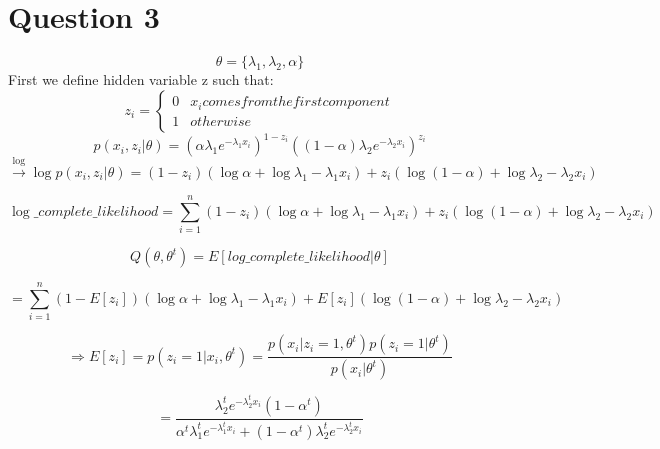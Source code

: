 \documentclass{article}
\begin{document}
\section*{Question 3}

\begin{equation*}
    \theta = \lbrace \lambda_1, \lambda_2, \alpha \rbrace
\end{equation*}
First we define hidden variable z such that:
\[
z_i =
\begin{cases}
0 & x_i comes from the first component \\
1  & otherwise
\end{cases}
\]
\begin{equation*}
    p(x_i, z_i | \theta) = (\alpha \lambda_1 e^{-\lambda_1 x_i})^{1-z_i} ((1-\alpha) \lambda_2 e^{- \lambda_2 x_i})^{z_i}
\end{equation*}
\begin{equation*}
    \xrightarrow{\log} \log{p(x_i, z_i|\theta)} = (1-z_i)(\log{\alpha} + \log{\lambda_1} - \lambda_1 x_i) + z_i(\log{(1-\alpha)} + \log{\lambda_2} - \lambda_2 x_i)
\end{equation*}

\begin{equation*}
    \log\_complete\_likelihood = \sum_{i=1}^{n} (1-z_i)(\log{\alpha} + \log{\lambda_1} - \lambda_1 x_i) + z_i(\log{(1-\alpha)} + \log{\lambda_2} - \lambda_2 x_i)
\end{equation*}

\begin{equation*}
    Q(\theta, \theta^t) = E[log\_complete\_likelihood | \theta]
\end{equation*}

\begin{equation*}
    = \sum_{i=1}^{n} (1 - E[z_i])(\log{\alpha} + \log{\lambda_1} - \lambda_1 x_i) 
    + E[z_i](\log{(1-\alpha)} + \log{\lambda_2} - \lambda_2 x_i)
\end{equation*}

\begin{equation*}
    \Rightarrow E[z_i] = p(z_i = 1 | x_i, \theta^t) = \frac{p(x_i|z_i=1, \theta^t)p(z_i=1|\theta^t)}{p(x_i|\theta^t)}
\end{equation*}

\begin{equation*}
    = \frac{\lambda_2^t e^{-\lambda_2^t x_i} (1 - \alpha^t)}{\alpha^t\lambda_1^t e^{-\lambda_1^t x_i} + (1 - \alpha^t)\lambda_2^t e^{-\lambda_2^t x_i}}
\end{equation*}
\end{document}
